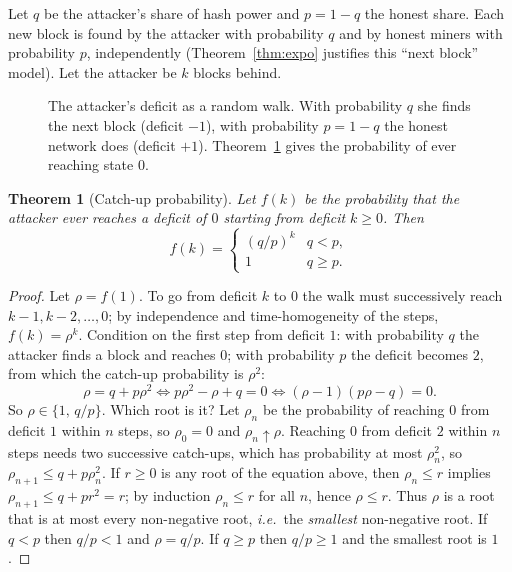 \documentclass[11pt,a4paper]{article}
\newenvironment{formal}{\par\smallskip}{\par\smallskip}
\theoremstyle{definition}
\theoremstyle{plain}
\newtheorem{theorem}[definition]{Theorem}
\theoremstyle{remark}
\newcommand{\ie}{\textit{i.e.}}
\begin{document}
\begin{formal}
Let $q$ be the attacker's share of hash power and $p=1-q$ the honest share. Each new block is found by the attacker with probability $q$ and by honest miners with probability $p$, independently
(Theorem~\ref{thm:expo} justifies this ``next block'' model). Let the attacker be $k$ blocks behind.

\begin{figure}[htbp]
\centering
{}
\caption{The attacker's deficit as a random walk. With probability $q$ she finds the next block (deficit $-1$), with probability $p=1-q$ the honest network does (deficit $+1$). Theorem~\ref{thm:gambler} gives the probability of ever reaching state $0$.}
\end{figure}

\begin{theorem}[Catch-up probability]\label{thm:gambler}
Let $f(k)$ be the probability that the attacker ever reaches a deficit of $0$ starting from deficit $k\ge0$. Then
$$f(k)=\begin{cases}(q/p)^k & q<p,\\ 1 & q\ge p.\end{cases}$$
\end{theorem}
\begin{proof}
Let $\rho=f(1)$. To go from deficit $k$ to $0$ the walk must successively reach $k-1,k-2,\dots,0$; by independence and time-homogeneity of the steps, $f(k)=\rho^k$.
Condition on the first step from deficit $1$: with probability $q$ the attacker finds a block and reaches $0$; with probability $p$ the deficit becomes $2$, from which the catch-up probability is $\rho^2$:
$$\rho=q+p\rho^2\iff p\rho^2-\rho+q=0\iff(\rho-1)(p\rho-q)=0.$$
So $\rho\in\{1,\,q/p\}$. Which root is it? Let $\rho_n$ be the probability of reaching $0$ from deficit $1$ within $n$ steps, so $\rho_0=0$ and $\rho_n\uparrow\rho$. Reaching $0$ from deficit $2$ within $n$ steps needs two successive catch-ups, which has probability at most $\rho_n^2$, so $\rho_{n+1}\le q+p\rho_n^2$. If $r\ge0$ is any root of the equation above, then $\rho_n\le r$ implies $\rho_{n+1}\le q+pr^2=r$; by induction $\rho_n\le r$ for all $n$, hence $\rho\le r$. Thus $\rho$ is a root that is at most every non-negative root, \ie\ the \emph{smallest} non-negative root. If $q<p$ then $q/p<1$ and $\rho=q/p$. If $q\ge p$ then $q/p\ge1$ and the smallest root is $1$. \qedhere
\end{proof}


\end{formal}
\end{document}
